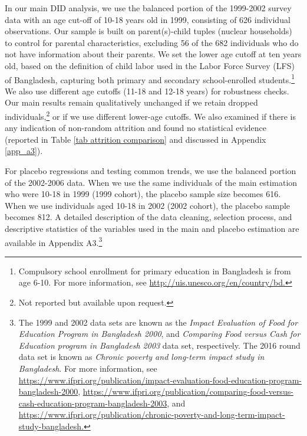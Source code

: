 \documentclass[12pt,letterpaper]{article}
\newcommand{\0}{\ensuremath{\mbox{\boldmath $0$}}}
\begin{document}
In our main DID analysis, we use the balanced portion of the 1999-2002 survey data with an age cut-off of 10-18 years old in 1999, consisting of 626 individual observations. Our sample is built on parent(s)-child tuples (nuclear households) to control for parental characteristics, excluding 56 of the 682 individuals who do not have information about their parents. We set the lower age cutoff at ten years old, based on the definition of child labor used in the Labor Force Survey (LFS) of Bangladesh, capturing both primary and secondary school-enrolled students.\footnote{Compulsory school enrollment for primary education in Bangladesh is from age 6-10. For more information, see \url{http://uis.unesco.org/en/country/bd.}} We also use different age cutoffs (11-18 and 12-18 years) for robustness checks. Our main results remain qualitatively unchanged if we retain dropped individuals,\footnote{Not reported but available upon request.} or if we use different lower-age cutoffs. We also examined if there is any indication of non-random attrition and found no statistical evidence (reported in Table \ref{tab attrition comparison} and discussed in Appendix \ref{app_a3}).

For placebo regressions and testing common trends, we use the balanced portion of the 2002-2006 data. When we use the same individuals of the main estimation who were 10-18 in 1999 (1999 cohort), the placebo sample size becomes 616. When we use individuals aged 10-18 in 2002 (2002 cohort), the placebo sample becomes 812. A detailed description of the data cleaning, selection process, and descriptive statistics of the variables used in the main and placebo estimation are available in Appendix A3.\footnote{The 1999 and 2002 data sets are known as the \textit{Impact Evaluation of Food for Education Program in Bangladesh 2000}, and \textit{Comparing Food versus Cash for Education program in Bangladesh 2003} data set, respectively. The 2016 round data set is known as \textit{Chronic poverty and long-term impact study in Bangladesh}. For more information, see \url{https://www.ifpri.org/publication/impact-evaluation-food-education-program-bangladesh-2000}, \url{https://www.ifpri.org/publication/comparing-food-versus-cash-education-program-bangladesh-2003}, and
\url{https://www.ifpri.org/publication/chronic-poverty-and-long-term-impact-study-bangladesh.}}
\end{document}

